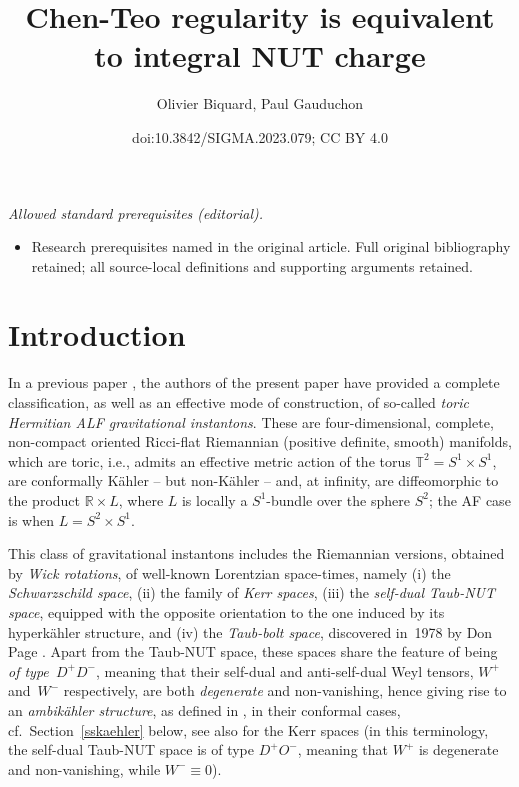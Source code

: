\documentclass[10pt,a4paper]{amsart}
\title{Chen-Teo regularity is equivalent to integral NUT charge}
\author{Olivier Biquard, Paul Gauduchon}
\date{doi:10.3842/SIGMA.2023.079; CC BY 4.0}
\numberwithin{equation}{section}
\begin{document}
\maketitle
\noindent\textit{Allowed standard prerequisites (editorial).}\begin{itemize}
\item Research prerequisites named in the original article. Full original bibliography retained; all source-local definitions and supporting arguments retained.
\end{itemize}\medskip
\section{Introduction} In a previous paper \cite{BG}, the authors of the present paper have provided a complete classification, as well as an effective mode of construction, of so-called {\it toric Hermitian ALF gravitational instantons}. These are four-dimensional, complete, non-compact oriented Ricci-flat Riemannian (positive definite, smooth) manifolds, which are toric, i.e., admits an effective metric action of the torus $\mathbb{T} ^2 = S^1 \times S^1$, are conformally K\"ahler -- but non-K\"ahler -- and, at infinity, are diffeomorphic to the product $\mathbb{R} \times L$, where $L$ is locally a $S^1$-bundle over the sphere $S^2$; the AF case is when $L = S ^2 \times S^1$.

This class of gravitational instantons includes the Riemannian versions, obtained by {\it Wick rotations}, of well-known Lorentzian space-times, namely (i) the {\it Schwarzschild space}, (ii) the family of {\it Kerr spaces}, (iii) the {\it self-dual Taub-NUT space}, equipped with the opposite orientation to the one induced by its hyperk\"ahler structure, and (iv) the {\it Taub-bolt space}, discovered in~1978 by Don Page \cite{P}. Apart from the Taub-NUT space, these spaces share the feature of being {\it of type~$D^+D^-$}, meaning that their self-dual and anti-self-dual Weyl tensors, $W^+$ and~$W^-$ respectively, are both {\it degenerate} and non-vanishing, hence giving rise to an {\it ambik\"ahler structure}, as defined in \cite{ACG}, in their conformal cases, cf.\ Section~\ref{sskaehler} below, see also \cite{dixon} for the Kerr spaces (in this terminology, the self-dual Taub-NUT space is of type $D^+O^-$, meaning that $W ^+$ is degenerate and non-vanishing, while $W ^- \equiv 0$).
\end{document}
